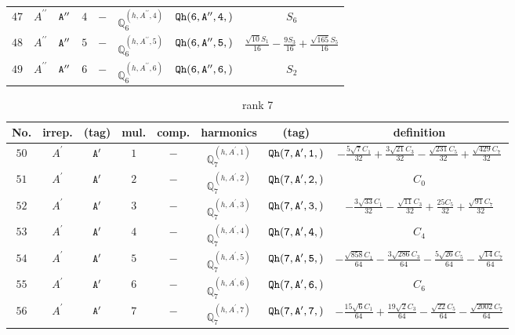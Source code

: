 \documentclass[fleqn,8pt]{jsarticle}
\begin{document}
\begin{table}[ht!]
\begin{center}
\begin{tabular}{cccccccc}
$ 47 $ & $ A^{\prime\prime} $ & $ {\tt A''} $ & $ 4 $ & $ - $ & $ \mathbb{Q}_{6}^{(h,A^{\prime\prime},4)} $ & $ {\tt Qh(6,A'',4,)} $ & $ S_{6} $ \\
$ 48 $ & $ A^{\prime\prime} $ & $ {\tt A''} $ & $ 5 $ & $ - $ & $ \mathbb{Q}_{6}^{(h,A^{\prime\prime},5)} $ & $ {\tt Qh(6,A'',5,)} $ & $ \frac{\sqrt{10} S_{1}}{16} - \frac{9 S_{3}}{16} + \frac{\sqrt{165} S_{5}}{16} $ \\
$ 49 $ & $ A^{\prime\prime} $ & $ {\tt A''} $ & $ 6 $ & $ - $ & $ \mathbb{Q}_{6}^{(h,A^{\prime\prime},6)} $ & $ {\tt Qh(6,A'',6,)} $ & $ S_{2} $ \\
 \hline \hline
\end{tabular}
\end{center}
\end{table}
\begin{table}[ht!]
\begin{center}
\caption{rank 7}
\renewcommand{\arraystretch}{1.3}
\begin{tabular}{cccccccc} \hline \hline
No. & irrep. & (tag) & mul. & comp. & harmonics & (tag) & definition \\ \hline
$ 50 $ & $ A^{\prime} $ & $ {\tt A'} $ & $ 1 $ & $ - $ & $ \mathbb{Q}_{7}^{(h,A^{\prime},1)} $ & $ {\tt Qh(7,A',1,)} $ & $ - \frac{5 \sqrt{7} C_{1}}{32} + \frac{3 \sqrt{21} C_{3}}{32} - \frac{\sqrt{231} C_{5}}{32} + \frac{\sqrt{429} C_{7}}{32} $ \\
$ 51 $ & $ A^{\prime} $ & $ {\tt A'} $ & $ 2 $ & $ - $ & $ \mathbb{Q}_{7}^{(h,A^{\prime},2)} $ & $ {\tt Qh(7,A',2,)} $ & $ C_{0} $ \\
$ 52 $ & $ A^{\prime} $ & $ {\tt A'} $ & $ 3 $ & $ - $ & $ \mathbb{Q}_{7}^{(h,A^{\prime},3)} $ & $ {\tt Qh(7,A',3,)} $ & $ - \frac{3 \sqrt{33} C_{1}}{32} - \frac{\sqrt{11} C_{3}}{32} + \frac{25 C_{5}}{32} + \frac{\sqrt{91} C_{7}}{32} $ \\
$ 53 $ & $ A^{\prime} $ & $ {\tt A'} $ & $ 4 $ & $ - $ & $ \mathbb{Q}_{7}^{(h,A^{\prime},4)} $ & $ {\tt Qh(7,A',4,)} $ & $ C_{4} $ \\
$ 54 $ & $ A^{\prime} $ & $ {\tt A'} $ & $ 5 $ & $ - $ & $ \mathbb{Q}_{7}^{(h,A^{\prime},5)} $ & $ {\tt Qh(7,A',5,)} $ & $ - \frac{\sqrt{858} C_{1}}{64} - \frac{3 \sqrt{286} C_{3}}{64} - \frac{5 \sqrt{26} C_{5}}{64} - \frac{\sqrt{14} C_{7}}{64} $ \\
$ 55 $ & $ A^{\prime} $ & $ {\tt A'} $ & $ 6 $ & $ - $ & $ \mathbb{Q}_{7}^{(h,A^{\prime},6)} $ & $ {\tt Qh(7,A',6,)} $ & $ C_{6} $ \\
$ 56 $ & $ A^{\prime} $ & $ {\tt A'} $ & $ 7 $ & $ - $ & $ \mathbb{Q}_{7}^{(h,A^{\prime},7)} $ & $ {\tt Qh(7,A',7,)} $ & $ - \frac{15 \sqrt{6} C_{1}}{64} + \frac{19 \sqrt{2} C_{3}}{64} - \frac{\sqrt{22} C_{5}}{64} - \frac{\sqrt{2002} C_{7}}{64} $ \\

\end{tabular}
\end{center}
\end{table}
\end{document}
